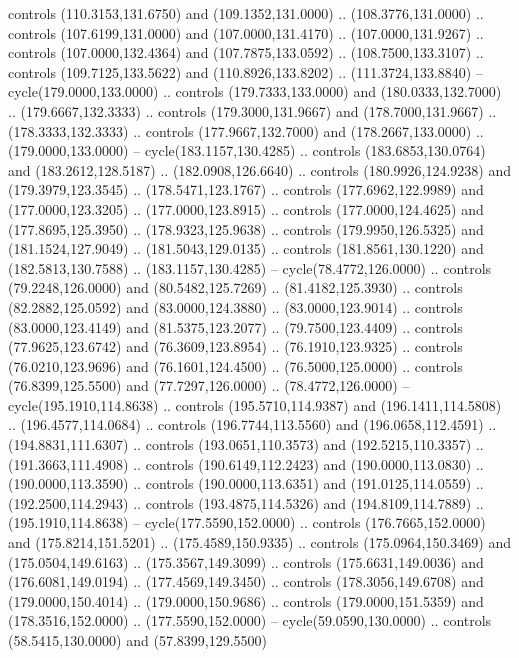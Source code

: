   controls (110.3153,131.6750) and (109.1352,131.0000) .. (108.3776,131.0000) ..
  controls (107.6199,131.0000) and (107.0000,131.4170) .. (107.0000,131.9267) ..
  controls (107.0000,132.4364) and (107.7875,133.0592) .. (108.7500,133.3107) ..
  controls (109.7125,133.5622) and (110.8926,133.8202) .. (111.3724,133.8840) --
  cycle(179.0000,133.0000) .. controls (179.7333,133.0000) and
  (180.0333,132.7000) .. (179.6667,132.3333) .. controls (179.3000,131.9667) and
  (178.7000,131.9667) .. (178.3333,132.3333) .. controls (177.9667,132.7000) and
  (178.2667,133.0000) .. (179.0000,133.0000) -- cycle(183.1157,130.4285) ..
  controls (183.6853,130.0764) and (183.2612,128.5187) .. (182.0908,126.6640) ..
  controls (180.9926,124.9238) and (179.3979,123.3545) .. (178.5471,123.1767) ..
  controls (177.6962,122.9989) and (177.0000,123.3205) .. (177.0000,123.8915) ..
  controls (177.0000,124.4625) and (177.8695,125.3950) .. (178.9323,125.9638) ..
  controls (179.9950,126.5325) and (181.1524,127.9049) .. (181.5043,129.0135) ..
  controls (181.8561,130.1220) and (182.5813,130.7588) .. (183.1157,130.4285) --
  cycle(78.4772,126.0000) .. controls (79.2248,126.0000) and (80.5482,125.7269)
  .. (81.4182,125.3930) .. controls (82.2882,125.0592) and (83.0000,124.3880) ..
  (83.0000,123.9014) .. controls (83.0000,123.4149) and (81.5375,123.2077) ..
  (79.7500,123.4409) .. controls (77.9625,123.6742) and (76.3609,123.8954) ..
  (76.1910,123.9325) .. controls (76.0210,123.9696) and (76.1601,124.4500) ..
  (76.5000,125.0000) .. controls (76.8399,125.5500) and (77.7297,126.0000) ..
  (78.4772,126.0000) -- cycle(195.1910,114.8638) .. controls (195.5710,114.9387)
  and (196.1411,114.5808) .. (196.4577,114.0684) .. controls (196.7744,113.5560)
  and (196.0658,112.4591) .. (194.8831,111.6307) .. controls (193.0651,110.3573)
  and (192.5215,110.3357) .. (191.3663,111.4908) .. controls (190.6149,112.2423)
  and (190.0000,113.0830) .. (190.0000,113.3590) .. controls (190.0000,113.6351)
  and (191.0125,114.0559) .. (192.2500,114.2943) .. controls (193.4875,114.5326)
  and (194.8109,114.7889) .. (195.1910,114.8638) -- cycle(177.5590,152.0000) ..
  controls (176.7665,152.0000) and (175.8214,151.5201) .. (175.4589,150.9335) ..
  controls (175.0964,150.3469) and (175.0504,149.6163) .. (175.3567,149.3099) ..
  controls (175.6631,149.0036) and (176.6081,149.0194) .. (177.4569,149.3450) ..
  controls (178.3056,149.6708) and (179.0000,150.4014) .. (179.0000,150.9686) ..
  controls (179.0000,151.5359) and (178.3516,152.0000) .. (177.5590,152.0000) --
  cycle(59.0590,130.0000) .. controls (58.5415,130.0000) and (57.8399,129.5500)
